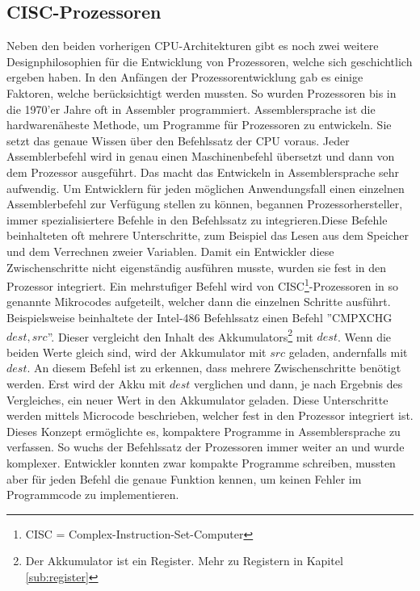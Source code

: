 \documentclass[a4paper,12pt]{article}
\begin{document}
\subsection{CISC-Prozessoren}
Neben den beiden vorherigen CPU-Architekturen gibt es noch zwei weitere Designphilosophien für die Entwicklung von Prozessoren, welche sich geschichtlich ergeben haben. In den Anfängen der Prozessorentwicklung gab es einige Faktoren, welche berücksichtigt werden mussten. So wurden Prozessoren bis in die 1970'er Jahre oft in Assembler programmiert. Assemblersprache ist die hardwarenäheste Methode, um Programme für Prozessoren zu entwickeln. Sie setzt das genaue Wissen über den Befehlssatz der CPU voraus. Jeder Assemblerbefehl wird in genau einen Maschinenbefehl übersetzt und dann von dem Prozessor ausgeführt. Das macht das Entwickeln in Assemblersprache sehr aufwendig. Um Entwicklern für jeden möglichen Anwendungsfall einen einzelnen Assemblerbefehl zur Verfügung stellen zu können, begannen Prozessorhersteller, immer spezialisiertere Befehle in den Befehlssatz zu integrieren.\linebreak Diese Befehle beinhalteten oft mehrere Unterschritte, zum Beispiel das Lesen aus dem Speicher und dem Verrechnen zweier Variablen. Damit ein Entwickler diese Zwischenschritte nicht eigenständig ausführen musste, wurden sie fest in den Prozessor integriert. Ein mehrstufiger Befehl wird von CISC\footnote{CISC = Complex-Instruction-Set-Computer}-Prozessoren in so genannte Mikrocodes aufgeteilt, welcher dann die einzelnen Schritte ausführt. Beispielsweise beinhaltete der Intel-486 Befehlssatz einen Befehl ''CMPXCHG  $dest,src$''\cite[S.172f]{intel4000}. Dieser vergleicht den Inhalt des Akkumulators\footnote{Der Akkumulator ist ein Register. Mehr zu Registern in Kapitel \ref{sub:register}} mit $dest$. Wenn die beiden Werte gleich sind, wird der Akkumulator mit $src$ geladen, andernfalls mit $dest$. An diesem Befehl ist zu erkennen, dass mehrere Zwischenschritte benötigt werden. Erst wird der Akku mit $dest$ verglichen und dann, je nach Ergebnis des Vergleiches, ein neuer Wert in den Akkumulator geladen. Diese Unterschritte werden mittels Microcode beschrieben, welcher fest in den Prozessor integriert ist. Dieses Konzept ermöglichte es, kompaktere Programme in Assemblersprache zu verfassen. So wuchs der Befehlssatz der Prozessoren immer weiter an und wurde komplexer. Entwickler konnten zwar kompakte Programme schreiben, mussten aber für jeden Befehl die genaue Funktion kennen, um keinen Fehler im Programmcode zu implementieren. 
\end{document}
